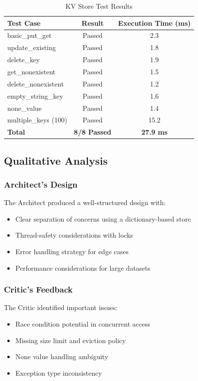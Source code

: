 \documentclass[12pt,a4paper]{article}
\begin{document}
\begin{table}[htbp]
\centering
\caption{KV Store Test Results}
\label{tab:tests}
\begin{tabular}{lcc}
\toprule
Test Case & Result & Execution Time (ms) \\
\midrule
basic\_put\_get & Passed & 2.3 \\
update\_existing & Passed & 1.8 \\
delete\_key & Passed & 1.9 \\
get\_nonexistent & Passed & 1.5 \\
delete\_nonexistent & Passed & 1.2 \\
empty\_string\_key & Passed & 1.6 \\
none\_value & Passed & 1.4 \\
multiple\_keys (100) & Passed & 15.2 \\
\midrule
\textbf{Total} & \textbf{8/8 Passed} & \textbf{27.9 ms} \\
\bottomrule
\end{tabular}
\end{table}

\subsection{Qualitative Analysis}

\subsubsection{Architect's Design}
The Architect produced a well-structured design with:
\begin{itemize}
    \item Clear separation of concerns using a dictionary-based store
    \item Thread-safety considerations with locks
    \item Error handling strategy for edge cases
    \item Performance considerations for large datasets
\end{itemize}

\subsubsection{Critic's Feedback}
The Critic identified important issues:
\begin{itemize}
    \item Race condition potential in concurrent access
    \item Missing size limit and eviction policy
    \item None value handling ambiguity
    \item Exception type inconsistency
\end{itemize}
\end{document}
